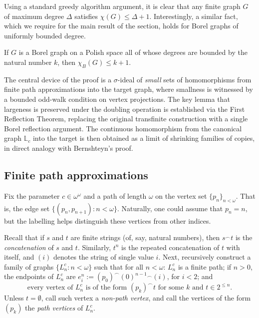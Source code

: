 Using a standard greedy algorithm argument, it is clear that any finite graph $G$ of maximum degree $\Delta$ satisfies $\chi(G)\leq\Delta+1$.
Interestingly, a similar fact, which we require for the main result of the section, holds for Borel graphs of uniformly bounded degree.

\begin{proposition}\label{prop:brooks}
    If $G$ is a Borel graph on a Polish space all of whose degrees are bounded by the natural number $k$, then $\chi_B(G)\leq k+1$.
\end{proposition}

The central device of the proof is a $\sigma$-ideal of \emph{small} sets of homomorphisms from finite path approximations into the target graph, where smallness is witnessed by a bounded odd-walk condition on vertex projections.
The key lemma that largeness is preserved under the doubling operation is established via the First Reflection Theorem, replacing the original transfinite construction with a single Borel reflection argument.
The continuous homomorphism from the canonical graph $\mathbb{L}_c$ into the target is then obtained as a limit of shrinking families of copies, in direct analogy with Bernshteyn's proof.

\subsection{Finite path approximations}\label{sec:finite-path-approx}

Fix the parameter $c\in\omega^\omega$ and a path of length $\omega$ on the vertex set $\{p_n\}_{n<\omega}$.
That is, the edge set $\{(p_n,p_{n+1}):n<\omega\}$.
Naturally, one could assume that $p_n=n$, but the labelling helps distinguish these vertices from other indices.

Recall that if $s$ and $t$ are finite strings (of, say, natural numbers), then $s^\frown t$ is the \emph{concatenation} of $s$ and $t$.
Similarly, $t^n$ is the repeated concatenation of $t$ with itself, and $(i)$ denotes the string of single value $i$.
Next, recursively construct a family of graphs $\{L^c_n:n<\omega\}$ such that for all $n<\omega$:
$L^c_n$ is a finite path; if $n>0$, the endpoints of $L^c_n$ are $e_i^n:=(p_0)^\smallfrown(0)^{n-1}{}^\smallfrown(i)$, for $i<2$; and
\begin{equation}
\text{every vertex of }L^c_n\text{ is of the form }(p_k)^\smallfrown t\text{ for some }k\text{ and }t\in2^{\leq n}.\label{eq:L_n-condition-iii}\end{equation}
Unless $t=\emptyset$, call such vertex a \emph{non-path vertex}, and call the vertices of the form $(p_k)$ the \emph{path vertices} of $L^c_n$.


